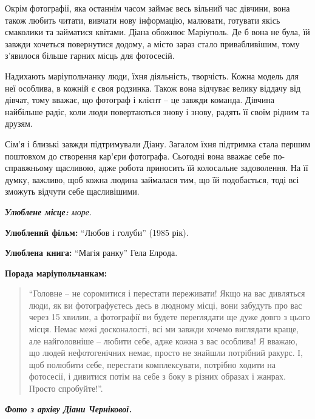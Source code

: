 
Окрім фотографії, яка останнім часом займає весь вільний час дівчини, вона
також любить читати, вивчати нову інформацію, малювати, готувати якісь
смаколики та займатися квітами. Діана обожнює Маріуполь. Де б вона не була, їй
завжди хочеться повернутися додому, а місто зараз стало привабливішим, тому
з'явилося більше гарних місць для фотосесій.


Надихають маріупольчанку люди, їхня діяльність, творчість. Кожна модель для неї
особлива, в кожній є своя родзинка. Також вона відчуває велику віддачу від
дівчат, тому вважає, що фотограф і клієнт – це завжди команда. Дівчина
найбільше радіє, коли люди повертаються знову і знову, радять її своїм рідним
та друзям.


Сім'я і близькі завжди підтримували Діану. Загалом їхня підтримка стала першим
поштовхом до створення кар'єри фотографа. Сьогодні вона вважає себе
по-справжньому щасливою, адже робота приносить їй колосальне задоволення. На її
думку, важливо, щоб кожна людина займалася тим, що їй подобається, тоді всі
зможуть відчути себе щасливішими.





\begingroup
\em
\textbf{Улюблене місце:} море.
\par\bigskip

\textbf{Улюблений фільм:} \enquote{Любов і голуби} (1985 рік).
\par\bigskip

\textbf{Улюблена книга:} \enquote{Магія ранку} Гела Елрода.
\par\bigskip

\textbf{Порада маріупольчанкам:} 
\par\bigskip

\begin{quote}
\enquote{Головне – не соромитися і перестати переживати! Якщо на вас дивляться люди, як
ви фотографуєтесь десь в людному місці, вони забудуть про вас через 15 хвилин,
а фотографії ви будете переглядати ще дуже довго з цього місця. Немає межі
досконалості, всі ми завжди хочемо виглядати краще, але найголовніше – любити
себе, адже кожна з вас особлива! Я вважаю, що людей нефотогенічних немає,
просто не знайшли потрібний ракурс. І, щоб полюбити себе, перестати
комплексувати, потрібно ходити на фотосесії, і дивитися потім на себе з боку в
різних образах і жанрах. Просто спробуйте!}.
\end{quote}
\endgroup


\textbf{\emph{Фото з архіву Діани Чернікової.}}
